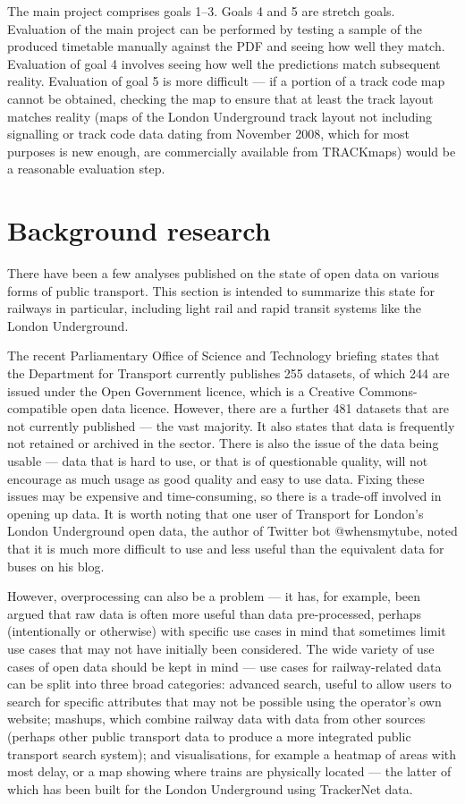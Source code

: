 \documentclass[a4paper,12pt]{article}
\begin{document}
The main project comprises goals 1--3. Goals 4 and 5 are stretch goals.
Evaluation of the main project can be performed by testing a sample of the
produced timetable manually against the PDF and seeing how well they match.
Evaluation of goal 4 involves seeing how well the predictions match subsequent
reality. Evaluation of goal 5 is more difficult --- if a portion of a track
code map cannot be obtained, checking the map to ensure that at least the track
layout matches reality (maps of the London Underground track layout not
including signalling or track code data dating from November 2008, which for
most purposes is new enough, are commercially available from
TRACKmaps\cite{TRACKmaps5}) would be a reasonable evaluation step.

\section{Background research}

There have been a few analyses published on the state of open data on various
forms of public transport. This section is intended to summarize this state for
railways in particular, including light rail and rapid transit systems like the
London Underground.

The recent Parliamentary Office of Science and Technology
briefing\cite{POSTnote472} states that the Department for Transport currently
publishes 255 datasets, of which 244 are issued under the Open Government
licence, which is a Creative Commons-compatible open data licence. However,
there are a further 481 datasets that are not currently published --- the vast
majority. It also states that data is frequently not retained or archived in
the sector. There is also the issue of the data being usable --- data that is
hard to use, or that is of questionable quality, will not encourage as much
usage as good quality and easy to use data. Fixing these issues may be
expensive and time-consuming, so there is a trade-off involved in opening up
data. It is worth noting that one user of Transport for London's London
Underground open data, the author of Twitter bot @whensmytube, noted that it is
much more difficult to use and less useful than the equivalent data for buses
on his blog\cite{whensmytube}.

However, overprocessing can also be a problem --- it has, for example, been
argued that raw data is often more useful than data pre-processed, perhaps
(intentionally or otherwise) with specific use cases in mind that sometimes
limit use cases that may not have initially been considered\cite{Robinson2009}.
The wide variety of use cases of open data should be kept in mind --- use cases
for railway-related data can be split into three broad
categories\cite{Kuhn2011}: advanced search, useful to allow users to search for
specific attributes that may not be possible using the operator's own website;
mashups, which combine railway data with data from other sources (perhaps other
public transport data to produce a more integrated public transport search
system); and visualisations, for example a heatmap of areas with most delay, or
a map showing where trains are physically located --- the latter of which has
been built for the London Underground using TrackerNet
data\cite{TrainTimesTube}.
\end{document}
